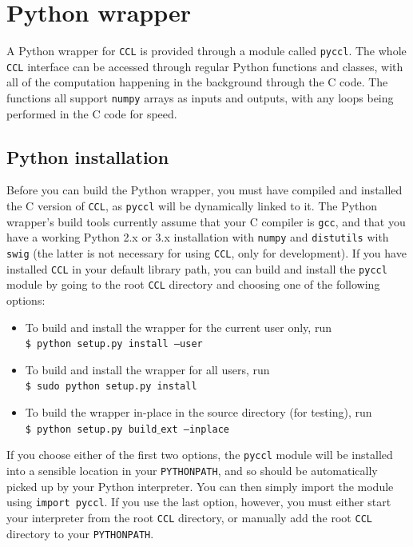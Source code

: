 \documentclass[\docopts]{\docclass}
\newcommand{\ccl}{{\tt CCL}\xspace}
\begin{document}
\section{Python wrapper}
\label{sec:python}

A Python wrapper for \ccl is provided through a module called {\tt pyccl}. The whole \ccl interface can be accessed through regular Python functions and classes, with all of the computation happening in the background through the C code. The functions all support {\tt numpy} arrays as inputs and outputs, with any loops being performed in the C code for speed.

\subsection{Python installation}
\label{sec:python:install}

Before you can build the Python wrapper, you must have compiled and installed the C version of \ccl, as {\tt pyccl} will be dynamically linked to it. The Python wrapper's build tools currently assume that your C compiler is {\tt gcc}, and that you have a working Python 2.x or 3.x installation with {\tt numpy} and {\tt distutils} with {\tt swig} (the latter is not necessary for using \ccl, only for development). If you have installed \ccl in your default library path, you can build and install the {\tt pyccl} module by going to the root \ccl directory and choosing one of the following options:
\begin{itemize}
 \item To build and install the wrapper for the current user only, run \\
 {\tt \$ python setup.py install --user}
 \item To build and install the wrapper for all users, run \\
 {\tt \$ sudo python setup.py install}
 \item To build the wrapper in-place in the source directory (for testing), run \\
 {\tt \$ python setup.py build$\_$ext --inplace}
\end{itemize}
If you choose either of the first two options, the {\tt pyccl} module will be installed into a sensible location in your {\tt PYTHONPATH}, and so should be automatically picked up by your Python interpreter. You can then simply import the module using {\tt import pyccl}. If you use the last option, however, you must either start your interpreter from the root \ccl directory, or manually add the root \ccl directory to your {\tt PYTHONPATH}.
\end{document}
